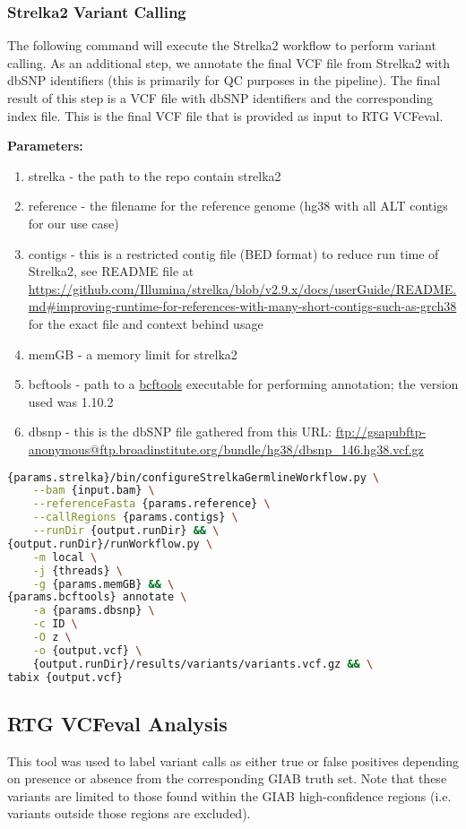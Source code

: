 \subsubsection{Strelka2 Variant Calling}
The following command will execute the Strelka2 workflow to perform variant calling.  As an additional step, we annotate the final VCF file from Strelka2 with dbSNP identifiers (this is primarily for QC purposes in the pipeline).  The final result of this step is a VCF file with dbSNP identifiers and the corresponding index file.  This is the final VCF file that is provided as input to RTG VCFeval.

\noindent\textbf{Parameters:}
\begin{enumerate}
    \item strelka - the path to the repo contain strelka2
    \item reference - the filename for the reference genome (hg38 with all ALT contigs for our use case)
    \item contigs - this is a restricted contig file (BED format) to reduce run time of Strelka2, see README file at \url{https://github.com/Illumina/strelka/blob/v2.9.x/docs/userGuide/README.md#improving-runtime-for-references-with-many-short-contigs-such-as-grch38} for the exact file and context behind usage
    \item memGB - a memory limit for strelka2
    \item bcftools - path to a \href{http://samtools.github.io/bcftools/bcftools.html}{bcftools} executable for performing annotation; the version used was 1.10.2
    \item dbsnp - this is the dbSNP file gathered from this URL: \url{ftp://gsapubftp-anonymous@ftp.broadinstitute.org/bundle/hg38/dbsnp_146.hg38.vcf.gz}
\end{enumerate}

\begin{lstlisting}[language=bash]
{params.strelka}/bin/configureStrelkaGermlineWorkflow.py \
    --bam {input.bam} \
    --referenceFasta {params.reference} \
    --callRegions {params.contigs} \
    --runDir {output.runDir} && \
{output.runDir}/runWorkflow.py \
    -m local \
    -j {threads} \
    -g {params.memGB} && \
{params.bcftools} annotate \
    -a {params.dbsnp} \
    -c ID \
    -O z \
    -o {output.vcf} \
    {output.runDir}/results/variants/variants.vcf.gz && \
tabix {output.vcf}
\end{lstlisting}

\subsection{RTG VCFeval Analysis}
\label{sec:rtg_vcfeval}
This tool was used to label variant calls as either true or false positives depending on presence or absence from the corresponding GIAB truth set. Note that these variants are limited to those found within the GIAB high-confidence regions (i.e. variants outside those regions are excluded).

